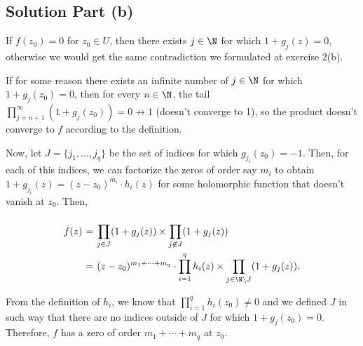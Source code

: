 \subsection*{Solution Part (b)}

If $f(z_0) = 0$ for $z_0 \in U$, then there exists $j \in \N$ for which $1+g_j(z) = 0$, otherwise we would get the same contradiction we formulated at exercise 2(b).

If for some reason there exists an infinite number of $j\in \N$ for which $1+g_j(z_0) = 0$, then for every $n\in \N$, the tail $\prod_{j = n+1}^{\infty} (1+g_j(z_0)) = 0 \not\to 1$ (doesn't converge to 1), so the product doesn't converge to $f$ according to the definition.


Now, let $J = \{j_1,\ldots, j_q\}$ be the set of indices for which $g_{j_i}(z_0) = -1$. Then, for each of this indices, we can factorize the zeros of order say $m_i$ to obtain $1+g_{j_i}(z) = (z-z_0)^{m_i}\cdot h_i(z)$ for some holomorphic function that doesn't vanish at $z_0$. Then,
\[ \everymath{\displaystyle}
\arraycolsep=1.8pt\def\arraystretch{2.5}
\begin{array}{rcl}
    f(z) & = & \prod_{j\in J} (1+g_j(z)) \times \prod_{j\not\in J} (1+g_j(z))\\
    & = & (z-z_0)^{m_1+\cdots+m_q}\cdot \prod_{i = 1}^q h_i(z) \times \prod_{j\in \N\backslash J} (1+g_j(z)).
\end{array}\]

From the definition of $h_i$, we know that $\prod_{i = 1}^q h_i(z_0) \neq 0$ and we defined $J$ in such way that there are no indices outside of $J$ for which $1+g_j(z_0) = 0$. Therefore, $f$ has a zero of order $m_1+\cdots+m_q$ at $z_0$.